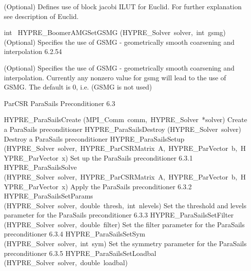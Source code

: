 \documentclass{article}
\begin{document}
\begin{cxxentry}
\begin{cxxentry}
\begin{cxxfunction}
\begin{cxxdoc}
(Optional) Defines use of block jacobi ILUT for Euclid.
For further explanation see description of Euclid.
\end{cxxdoc}
\end{cxxfunction}
\begin{cxxfunction}
{int\ }
        {HYPRE\_BoomerAMGSetGSMG}
        {(HYPRE\_Solver\ solver,\ int\ gsmg)}
        {
(Optional) Specifies the use of GSMG - geometrically smooth 
coarsening and interpolation}
        {6.2.54}
\begin{cxxdoc}

(Optional) Specifies the use of GSMG - geometrically smooth 
coarsening and interpolation. Currently any nonzero value for
gsmg will lead to the use of GSMG.
The default is 0, i.e. (GSMG is not used)
\end{cxxdoc}
\end{cxxfunction}
\end{cxxentry}
\begin{cxxentry}
{}
        {ParCSR ParaSails Preconditioner}
        {}
        {
}
        {6.3}
\begin{cxxnames}
        {HYPRE\_ParaSailsCreate}
        {(MPI\_Comm\ comm,\ HYPRE\_Solver\ *solver)}
        {
Create a ParaSails preconditioner}
        {}
\label{cxx.6.3.10}
        {HYPRE\_ParaSailsDestroy}
        {(HYPRE\_Solver\ solver)}
        {
Destroy a ParaSails preconditioner}
        {}
\label{cxx.6.3.11}
        {HYPRE\_ParaSailsSetup}
        {(HYPRE\_Solver\ solver,\ HYPRE\_ParCSRMatrix\ A,\ HYPRE\_ParVector\ b,\ HYPRE\_ParVector\ x)}
        {
Set up the ParaSails preconditioner}
        {6.3.1}
        {HYPRE\_ParaSailsSolve}
        {(HYPRE\_Solver\ solver,\ HYPRE\_ParCSRMatrix\ A,\ HYPRE\_ParVector\ b,\ HYPRE\_ParVector\ x)}
        {
Apply the ParaSails preconditioner}
        {6.3.2}
        {HYPRE\_ParaSailsSetParams}
        {(HYPRE\_Solver\ solver,\ double\ thresh,\ int\ nlevels)}
        {
Set the threshold and levels parameter for the ParaSails
preconditioner}
        {6.3.3}
        {HYPRE\_ParaSailsSetFilter}
        {(HYPRE\_Solver\ solver,\ double\ filter)}
        {
Set the filter parameter for the 
ParaSails preconditioner}
        {6.3.4}
        {HYPRE\_ParaSailsSetSym}
        {(HYPRE\_Solver\ solver,\ int\ sym)}
        {
Set the symmetry parameter for the
ParaSails preconditioner}
        {6.3.5}
        {HYPRE\_ParaSailsSetLoadbal}
        {(HYPRE\_Solver\ solver,\ double\ loadbal)}
        {
}
\end{cxxnames}
\end{cxxentry}
\end{cxxentry}
\end{document}
